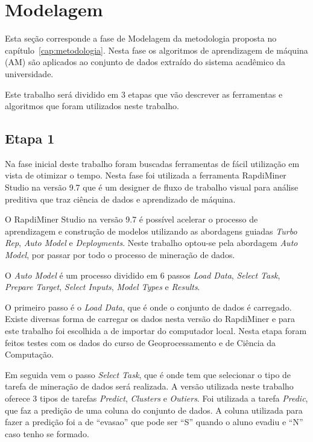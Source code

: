 \documentclass[diss,capa]{texufpel}
\begin{document}
\section{Modelagem}

Esta seção corresponde a fase de Modelagem da metodologia proposta no capítulo~\ref{cap:metodologia}.
Nesta fase os algoritmos de aprendizagem de máquina (AM) são aplicados ao conjunto de dados extraído do sistema acadêmico da universidade.

Este trabalho será dividido em 3 etapas que vão descrever as ferramentas e algoritmos que foram utilizados neste trabalho.

\subsection{Etapa 1}

Na fase inicial deste trabalho foram buscadas ferramentas de fácil utilização em vista de otimizar o tempo. Nesta fase foi utilizada a ferramenta RapdiMiner Studio na versão 9.7 que é um designer de fluxo de trabalho visual para análise preditiva que traz ciência de dados e aprendizado de máquina.

O RapdiMiner Studio na versão 9.7 é possível acelerar o processo de aprendizagem e construção de modelos utilizando as abordagens guiadas \textit{Turbo Rep}, \textit{Auto Model} e \textit{Deployments}. Neste trabalho optou-se pela abordagem \textit{Auto Model}, por passar por todo o processo de mineração de dados.

O \textit{Auto Model} é um processo dividido em 6 passos \textit{Load Data}, \textit{Select Task}, \textit{Prepare Target}, \textit{Select Inputs}, \textit{Model Types} e \textit{Results}.

O primeiro passo é o \textit{Load Data}, que  é onde o conjunto de dados é carregado. Existe diversas forma de carregar os dados nesta versão do RapdiMiner e para este trabalho foi escolhida a de importar do computador local. Nesta etapa foram feitos testes com os dados do curso de Geoprocessamento e de Ciência da Computação.

Em seguida vem o passo \textit{Select Task}, que é onde tem que selecionar o tipo de tarefa de mineração de dados será realizada. A versão utilizada neste trabalho oferece 3 tipos de tarefas \textit{Predict}, \textit{Clusters} e \textit{Outiers}. Foi utilizada a tarefa \textit{Predic}, que faz a predição de uma coluna do conjunto de dados. A coluna utilizada para fazer a predição foi a de ``evasao'' que pode ser ``S'' quando o aluno evadiu e ``N'' caso tenho se formado.
\end{document}
